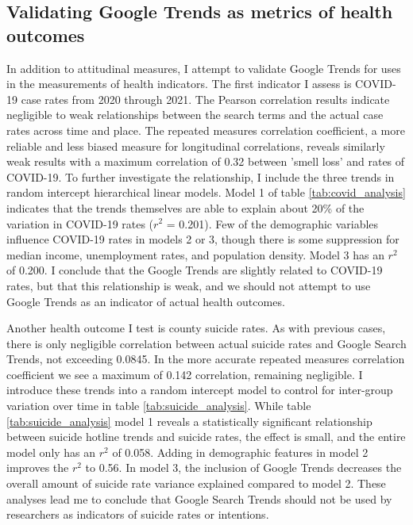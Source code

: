 

\subsection{Validating Google Trends as metrics of health outcomes}

In addition to attitudinal measures, I attempt to validate Google Trends for
uses in the measurements of health indicators. The first indicator I assess is
COVID-19 case rates from 2020 through 2021. The Pearson correlation results
indicate negligible to weak relationships between the search terms and the
actual case rates across time and place. The repeated measures correlation
coefficient, a more reliable and less biased measure for longitudinal
correlations, reveals similarly weak results with a maximum correlation of 0.32
between 'smell loss' and rates of COVID-19. To further investigate the relationship, I
include the three trends in random intercept hierarchical linear models. Model 1
of table \ref{tab:covid_analysis} indicates that the trends themselves are able
to explain about 20\% of the variation in COVID-19 rates ($r^2$ = 0.201). Few
of the demographic variables influence COVID-19 rates in models 2 or 3,
though there is some suppression for median income, unemployment rates,
and population density. Model 3 has an $r^2$ of 0.200. I conclude that the
Google Trends are slightly related to COVID-19 rates, but that this relationship
is weak, and we should not attempt to use Google Trends as an indicator of actual
health outcomes.



Another health outcome I test is county suicide rates. As with previous cases,
there is only negligible correlation between actual suicide rates and Google
Search Trends, not exceeding 0.0845. In the more accurate repeated measures
correlation coefficient we see a maximum of 0.142 correlation, remaining
negligible. I introduce these trends into a random intercept model to control
for inter-group variation over time in table \ref{tab:suicide_analysis}. While
table \ref{tab:suicide_analysis} model 1 reveals a statistically significant relationship
between suicide hotline trends and suicide rates, the effect is small, and the
entire model only has an $r^2$ of 0.058. Adding in demographic features in model
2 improves the $r^2$ to 0.56. In model 3, the inclusion of Google Trends
decreases the overall amount of suicide rate variance explained
compared to model 2. These analyses lead me to conclude that Google Search
Trends should not be used by researchers as indicators of suicide rates or intentions.


